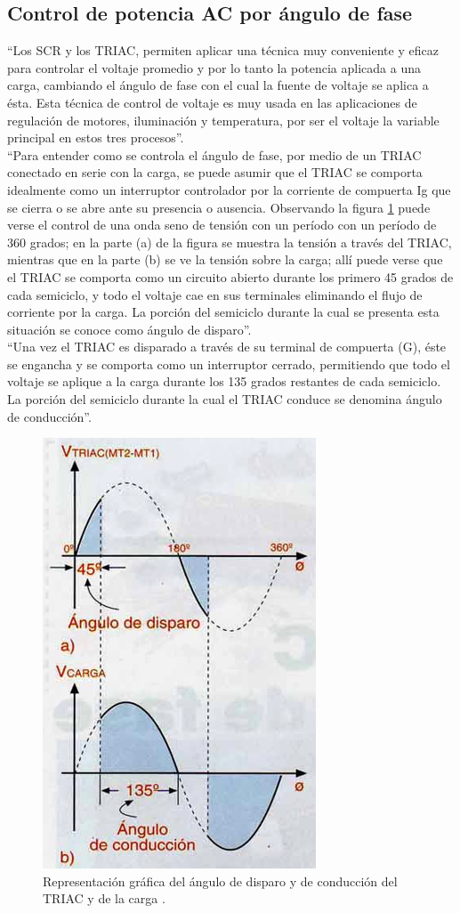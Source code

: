 \subsection{Control de potencia AC por ángulo de fase}

``Los SCR y los TRIAC, permiten aplicar una técnica muy conveniente y eficaz para controlar el voltaje promedio y por lo tanto la potencia aplicada a una carga, cambiando el ángulo de fase con el cual la fuente de voltaje se aplica a ésta. Esta técnica de control de voltaje es muy usada en las aplicaciones de regulación de motores, iluminación y temperatura, por ser el voltaje la variable principal en estos tres procesos''.\cite{CEKIT}\\

``Para entender como se controla el ángulo de fase, por medio de un TRIAC conectado en serie con la carga, se puede asumir que el TRIAC se comporta idealmente como un interruptor controlador por la corriente de compuerta Ig que se cierra o se abre ante su presencia o ausencia. Observando la figura \ref{fig:triacgraph} puede verse el control de una onda seno de tensión con un período con un período de 360 grados; en la parte (a) de la figura se muestra la tensión a través del TRIAC, mientras que en la parte (b) se ve la tensión sobre la carga; allí puede verse que el TRIAC se comporta como un circuito abierto durante los primero 45 grados de cada semiciclo, y todo el voltaje cae en sus terminales eliminando el flujo de corriente por la carga. La porción del semiciclo durante la cual se presenta esta situación se conoce como ángulo de disparo''\cite{CEKIT}.\\

``Una vez el TRIAC es disparado a través de su terminal de compuerta (G), éste se engancha y se comporta como un interruptor cerrado, permitiendo que todo el voltaje se aplique a la carga durante los 135 grados restantes de cada semiciclo. La porción del semiciclo durante la cual el TRIAC conduce se denomina ángulo de conducción''\cite{CEKIT}.\\

\begin{figure}
	\centering
	\caption{Representación gráfica del ángulo de disparo y de conducción del TRIAC y de la carga \cite{CEKIT}.}
	\label{fig:triacgraph}
	\includegraphics[width=0.3\linewidth]{Imagenes/TRIAC_graph}
\end{figure}


